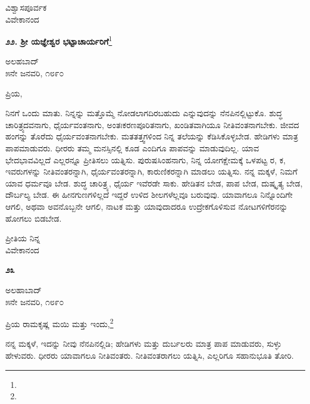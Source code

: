 {\flushright
ವಿಶ್ವಾಸಪೂರ್ವಕ\\ವಿವೇಕಾನಂದ\par}

\newpage

\begin{center}
\textbf{೨೨. ಶ‍್ರೀ ಯಜ್ಞೇಶ್ವರ ಭಟ್ಟಾಚಾರ್ಯರಿಗೆ}\footnote{}
\end{center}

\begin{flushright}
ಅಲಹಬಾದ್\\೫ನೇ ಜನವರಿ, ೧೮೯೦
\end{flushright}

\noindent
ಪ್ರಿಯ,

ನಿನಗೆ ಒಂದು ಮಾತು. ನಿನ್ನನ್ನು ಮತ್ತೊಮ್ಮೆ ನೋಡಲಾಗದಿರಬಹುದು ಎನ್ನುವುದನ್ನು ನೆನಪಿನಲ್ಲಿಟ್ಟುಕೊ. ಶುದ್ಧ ಚಾರಿತ್ರ್ಯದವನಾಗು, ಧೈರ್ಯವಂತನಾಗು, ಅಂತಃಕರಣಪೂರಿತನಾಗು, ಖಂಡಿತವಾಗಿಯೂ ನೀತಿವಂತನಾಗಬೇಕು. ಜೀವದ ಹಂಗನ್ನು ತೊರೆದು ಧೈರ್ಯವಂತನಾಗಬೇಕು. ಮತತತ್ತ್ವಗಳಿಂದ ನಿನ್ನ ತಲೆಯನ್ನು ಕೆಡಿಸಿಕೊಳ್ಳಬೇಡ. ಹೇಡಿಗಳು ಮಾತ್ರ ಪಾಪಮಾಡುವರು. ಧೀರರು ತಮ್ಮ ಮನಸ್ಸಿನಲ್ಲಿ ಕೂಡ ಎಂದಿಗೂ ಪಾಪವನ್ನು ಮಾಡುವುದಿಲ್ಲ. ಯಾವ ಭೇದಭಾವವಿಲ್ಲದೆ ಎಲ್ಲರನ್ನೂ ಪ್ರೀತಿಸಲು ಯತ್ನಿಸು. ಪುರುಷಸಿಂಹನಾಗು, ನಿನ್ನ ಯೋಗಕ್ಷೇಮಕ್ಕೆ ಒಳಪಟ್ಟ ರ\enginline{-}, ಕ\enginline{-}, ಇವರುಗಳನ್ನು ನೀತಿವಂತರನ್ನಾಗಿ, ಧೈರ್ಯವಂತರನ್ನಾಗಿ, ಕಾರುಣಿಕರನ್ನಾಗಿ ಮಾಡಲು ಯತ್ನಿಸು. ನನ್ನ ಮಕ್ಕಳೆ, ನಿಮಗೆ ಯಾವ ಧರ್ಮವೂ ಬೇಡ. ಶುದ್ಧ ಚಾರಿತ್ರ್ಯ, ಧೈರ್ಯ ಇವೆರಡೇ ಸಾಕು. ಹೇಡಿತನ ಬೇಡ, ಪಾಪ ಬೇಡ, ದುಷ್ಕೃತ್ಯ ಬೇಡ, ದೌರ್ಬಲ್ಯ ಬೇಡ. ಈ ಹೀನಗುಣಗಳಿಲ್ಲದೆ ಇದ್ದರೆ ಉಳಿದ ಶೀಲಗಳೆಲ್ಲವೂ ಬರುವುವು. ಯಾವಾಗಲೂ ನಿನ್ನೊಂದಿಗೇ ಆಗಲಿ, ಅಥವಾ ಅವನೊಬ್ಬನೇ ಆಗಲಿ, ನಾಟಕ ಮತ್ತು ಯಾವುದಾದರೂ ಉದ್ರೇಕಗೊಳಿಸುವ ನೋಟಗಳಿಗೆ\break ರ\enginline{-}ನನ್ನು ಹೋಗಲು ಬಿಡಬೇಡ.

\vspace{-0.5cm}

{\flushright
ಪ್ರೀತಿಯ ನಿನ್ನ\\ವಿವೇಕಾನಂದ\par}

\begin{center}
\textbf{೨೩}
\end{center}


\vspace{-0.5cm}

\begin{flushright}
ಅಲಹಾಬಾದ್\\೫ನೇ ಜನವರಿ, ೧೮೯೦
\end{flushright}

\noindent
ಪ್ರಿಯ ರಾಮಕೃಷ್ಣ ಮಯಿ ಮತ್ತು ಇಂದು,\footnote{}

ನನ್ನ ಮಕ್ಕಳೆ, ಇದನ್ನು ನೀವು ನೆನಪಿನಲ್ಲಿಡಿ; ಹೇಡಿಗಳು ಮತ್ತು ದುರ್ಬಲರು ಮಾತ್ರ ಪಾಪ ಮಾಡುವರು, ಸುಳ್ಳು ಹೇಳುವರು. ಧೀರರು ಯಾವಾಗಲೂ ನೀತಿವಂತರು. ನೀತಿವಂತರಾಗಲು ಯತ್ನಿಸಿ, ಎಲ್ಲರಿಗೂ ಸಹಾನುಭೂತಿ ತೋರಿ.

